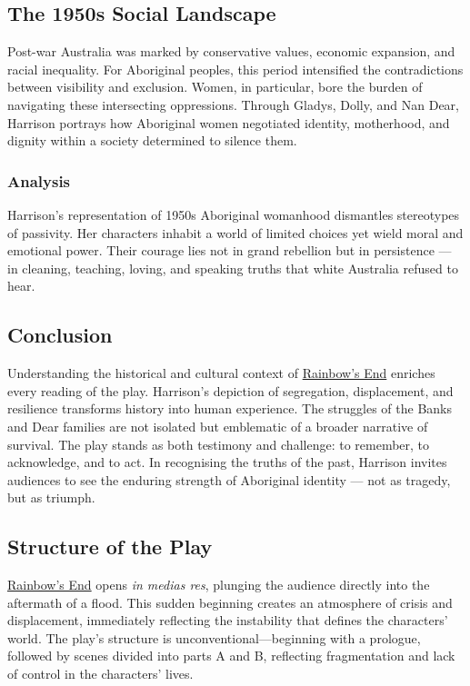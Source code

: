 \documentclass[a4paper]{article}
\begin{document}
\subsection{The 1950s Social Landscape}
Post-war Australia was marked by conservative values, economic expansion, and racial inequality. For Aboriginal peoples, this period intensified the contradictions between visibility and exclusion. Women, in particular, bore the burden of navigating these intersecting oppressions. Through Gladys, Dolly, and Nan Dear, Harrison portrays how Aboriginal women negotiated identity, motherhood, and dignity within a society determined to silence them.\\

\subsubsection{Analysis}
Harrison’s representation of 1950s Aboriginal womanhood dismantles stereotypes of passivity. Her characters inhabit a world of limited choices yet wield moral and emotional power. Their courage lies not in grand rebellion but in persistence — in cleaning, teaching, loving, and speaking truths that white Australia refused to hear.\\

\subsection{Conclusion}
Understanding the historical and cultural context of \underline{Rainbow's End} enriches every reading of the play. Harrison’s depiction of segregation, displacement, and resilience transforms history into human experience. The struggles of the Banks and Dear families are not isolated but emblematic of a broader narrative of survival. The play stands as both testimony and challenge: to remember, to acknowledge, and to act. In recognising the truths of the past, Harrison invites audiences to see the enduring strength of Aboriginal identity — not as tragedy, but as triumph.\\



\subsection{Structure of the Play}
\underline{Rainbow's End} opens \textit{in medias res}, plunging the audience directly into the aftermath of a flood. This sudden beginning creates an atmosphere of crisis and displacement, immediately reflecting the instability that defines the characters’ world. The play’s structure is unconventional—beginning with a prologue, followed by scenes divided into parts A and B, reflecting fragmentation and lack of control in the characters’ lives.\\
\end{document}
